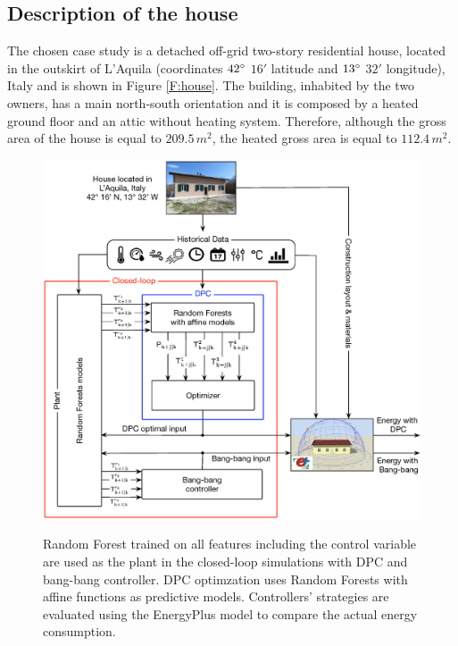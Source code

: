 \subsection{Description of the house}\label{SS:descriptionHouse}
The chosen case study is a detached off-grid two-story residential house, located in the outskirt of L'Aquila (coordinates $42\degree$ $16'$ latitude and $13\degree$ $32'$ longitude), Italy and is shown in Figure \ref{F:house}. The building, inhabited by the two owners, has a main north-south orientation and it is composed by a heated ground floor and an attic without heating system. Therefore, although the gross area of the house is equal to $209.5\,m^2$, the heated gross area is equal to $112.4\,m^2$.
\begin{figure}[t!]
	\begin{center}
		\includegraphics[width=1\linewidth]{figures/overview.eps}
		\caption{Random Forest trained on all features including the control variable are used as the plant in the closed-loop simulations with DPC and bang-bang controller. DPC optimzation uses Random Forests with affine functions as predictive models. Controllers' strategies are evaluated using the EnergyPlus model to compare the actual energy consumption.}
		\captionsetup{justification=centering}
		\label{F:overview}
	\end{center}
\end{figure}
